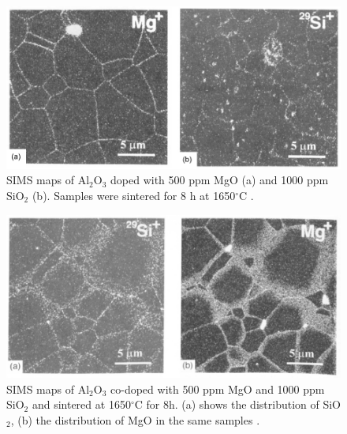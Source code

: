 \newpage
\begin{figure}[H]
	\centering
	\includegraphics{Chapter-1/Figures/Figure1.png}
	\caption{SIMS maps of Al$_{2}$O$_{3}$ doped with 500 ppm MgO (a) and 1000 ppm SiO$_{2}$ (b). Samples were sintered for 8 h at 1650$^{\circ}$C \cite{Gavrilov1999}.}
	\label{Ch1-figure:Figure1}
\end{figure}

\newpage
\begin{figure}[H]
	\centering
	\includegraphics{Chapter-1/Figures/Figure2.png}
	\caption{SIMS maps of Al$_{2}$O$_{3}$ co-doped with 500 ppm MgO and 1000 ppm SiO$_{2}$ and sintered at 1650$^{\circ}$C for 8h. (a) shows the distribution of SiO$_{2}$, (b) the distribution of MgO in the same samples \cite{Gavrilov1999}.}
	\label{Ch1-figure:Figure2}
\end{figure}
